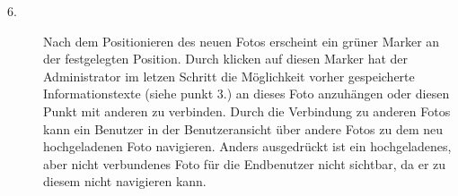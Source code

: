 \begin{description}
  \item[6.] Nach dem Positionieren des neuen Fotos erscheint ein grüner Marker an der festgelegten Position. Durch klicken auf diesen Marker hat der Administrator im letzen Schritt die Möglichkeit vorher gespeicherte Informationstexte (siehe punkt 3.) an dieses Foto anzuhängen oder diesen Punkt mit anderen zu verbinden. Durch die Verbindung zu anderen Fotos kann ein Benutzer in der Benutzeransicht über andere Fotos zu dem neu hochgeladenen Foto navigieren. Anders ausgedrückt ist ein hochgeladenes, aber nicht verbundenes Foto für die Endbenutzer nicht sichtbar, da er zu diesem nicht navigieren kann.
\end{description}